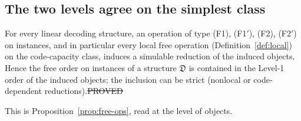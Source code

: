 \subsection{The two levels agree on the simplest class}\label{sec:levels-agree}

\begin{proposition}\label{prop:level-incl}
For every linear decoding structure, an operation of type (F1), (F1$'$), (F2), (F2$'$) on instances, and in particular every local free operation (Definition~\ref{def:local}) on the code-capacity class, induces a simulable reduction of the induced objects.
Hence the free order on instances of a structure $\mathfrak D$ is contained in the Level-1 order of the induced objects; the inclusion can be strict (nonlocal or code-dependent reductions).\hfill\st{PROVED}
\end{proposition}
\noindent This is Proposition~\ref{prop:free-ops}, read at the level of objects.

